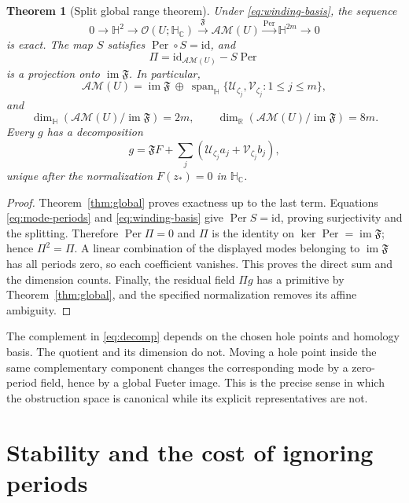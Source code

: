 \documentclass[11pt,a4paper]{article}
\numberwithin{equation}{section}
\newtheorem{theorem}{Theorem}[section]
\theoremstyle{definition}
\theoremstyle{remark}
\newcommand{\R}{\mathbb R}
\newcommand{\C}{\mathbb C}
\newcommand{\HH}{\mathbb H}
\newcommand{\HC}{\mathbb H_{\C}}
\newcommand{\Fu}{\mathfrak F}
\newcommand{\AM}{\mathcal{AM}}
\newcommand{\Hol}{\mathcal O}
\newcommand{\Per}{\operatorname{Per}}
\newcommand{\im}{\operatorname{im}}
\newcommand{\Uker}{\mathcal U}
\newcommand{\Vker}{\mathcal V}
\begin{document}
\begin{theorem}[Split global range theorem]\label{thm:split}
Under \eqref{eq:winding-basis}, the sequence
\begin{equation}\label{eq:exact-finite}
 0\longrightarrow\HH^2\longrightarrow\Hol(U;\HC)
 \xrightarrow{\Fu}\AM(U)\xrightarrow{\Per}\HH^{2m}
 \longrightarrow0
\end{equation}
is exact. The map $S$ satisfies $\Per\circ S=\mathrm{id}$, and
\begin{equation}\label{eq:projection}
 \Pi=\mathrm{id}_{\AM(U)}-S\Per
\end{equation}
is a projection onto $\im\Fu$. In particular,
\begin{equation}\label{eq:decomp}
 \AM(U)=\im\Fu\ \oplus\
 \operatorname{span}_{\HH}\{\Uker_{\zeta_j},\Vker_{\zeta_j}:1\le j\le m\},
\end{equation}
and
\begin{equation}\label{eq:codim}
 \dim_{\HH}(\AM(U)/\im\Fu)=2m,\qquad
 \dim_{\R}(\AM(U)/\im\Fu)=8m.
\end{equation}
Every $g$ has a decomposition
\[
 g=\Fu F+\sum_j(\Uker_{\zeta_j}a_j+\Vker_{\zeta_j}b_j),
\]
unique after the normalization $F(z_*)=0$ in $\HC$.
\end{theorem}
\begin{proof}
Theorem~\ref{thm:global} proves exactness up to the last term. Equations
\eqref{eq:mode-periods} and \eqref{eq:winding-basis} give
$\Per S=\mathrm{id}$, proving surjectivity and the splitting. Therefore
$\Per\Pi=0$ and $\Pi$ is the identity on $\ker\Per=\im\Fu$; hence
$\Pi^2=\Pi$. A linear combination of the displayed modes belonging to
$\im\Fu$ has all periods zero, so each coefficient vanishes. This proves
the direct sum and the dimension counts. Finally, the residual field
$\Pi g$ has a primitive by Theorem~\ref{thm:global}, and the specified
normalization removes its affine ambiguity.
\end{proof}

The complement in \eqref{eq:decomp} depends on the chosen hole points and
homology basis. The quotient and its dimension do not. Moving a hole
point inside the same complementary component changes the corresponding
mode by a zero-period field, hence by a global Fueter image. This is the
precise sense in which the obstruction space is canonical while its
explicit representatives are not.

\section{Stability and the cost of ignoring periods}
\label{sec:stability}
\end{document}
